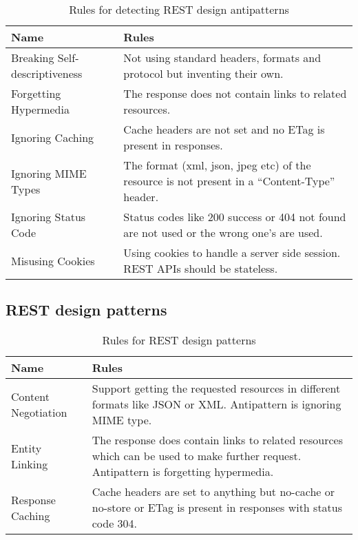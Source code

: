 \documentclass[a4paper,12pt]{article}
\begin{document}
\begin{center}
\begin{table}[!ht]
\begin{tabular}{|p{25mm}|p{110mm}|}
\hline \textbf{Name} & \textbf{Rules} \\
\hline 
Breaking Self-descriptiveness &
Not using standard headers, formats and protocol but inventing their own. 
\\ \hline
Forgetting Hypermedia &
The response does not contain links to related resources. 
\\ \hline
Ignoring Caching &
Cache headers are not set and no ETag is present in responses.
\\ \hline
Ignoring MIME Types &
The format (xml, json, jpeg etc) of the resource is not present in a “Content-Type” header.
\\ \hline
Ignoring Status Code &
Status codes like 200 success or 404 not found are not used or the wrong one’s are used.
\\ \hline
Misusing Cookies &
Using cookies to handle a server side session. REST APIs should be stateless. 
\\ \hline
\end{tabular}
    \caption{Rules for detecting REST design antipatterns}
    \label{tab:Rules for detecting REST design antipatterns}
\end{table}
\end{center}

\subsection{REST design patterns}

\begin{center}
\begin{table}[!ht]
\begin{tabular}{|p{25mm}|p{110mm}|}
\hline \textbf{Name} & \textbf{Rules} \\
\hline 
Content Negotiation &
Support getting the requested resources in different formats like JSON or XML. Antipattern is ignoring MIME type.
\\ \hline
Entity Linking &
The response does contain links to related resources which can be used to make further request. Antipattern is forgetting hypermedia.
\\ \hline
Response Caching &
Cache headers are set to anything but no-cache or no-store or ETag is present in responses with status code 304.
\\ \hline
\end{tabular}
    \caption{Rules for REST design patterns}
    \label{tab:Rules for REST design patterns}
\end{table}
\end{center}
\end{document}
